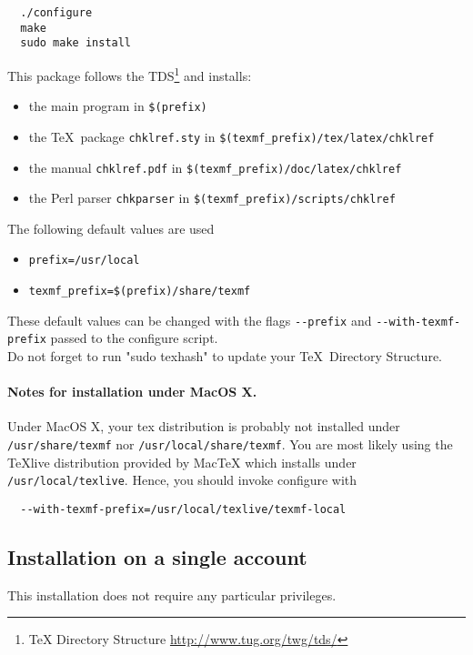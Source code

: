 \documentclass[a4paper,11pt,twoside]{article}
\begin{document}
\begin{verbatim}
  ./configure
  make
  sudo make install
\end{verbatim}
This package follows the TDS\footnote{TeX Directory Structure
  \url{http://www.tug.org/twg/tds/}} and installs:
\begin{itemize}
  \item  the main program in \verb!$(prefix)!
  \item  the \TeX\ package \verb!chklref.sty! in \verb!$(texmf_prefix)/tex/latex/chklref!
  \item  the manual \verb!chklref.pdf! in \verb!$(texmf_prefix)/doc/latex/chklref!
  \item  the Perl parser \verb!chkparser! in \verb!$(texmf_prefix)/scripts/chklref!
\end{itemize}
The following default values are used
\begin{itemize}
  \item  \verb!prefix=/usr/local!
  \item \verb!texmf_prefix=$(prefix)/share/texmf!
\end{itemize}

These default values can be changed with the flags \verb!--prefix!  and
\verb!--with-texmf-prefix! passed to the configure script.\\

Do not forget to run "sudo texhash" to update your \TeX\ Directory Structure.

\paragraph{Notes for installation under MacOS X.}

Under MacOS X, your tex distribution is probably not installed under
\verb!/usr/share/texmf! nor \verb!/usr/local/share/texmf!. You are most likely using
the TeXlive distribution provided by MacTeX which installs under
\verb!/usr/local/texlive!. Hence, you should invoke configure with

\begin{verbatim}
  --with-texmf-prefix=/usr/local/texlive/texmf-local
\end{verbatim}

\subsection{Installation on a single account}

This installation does not require any particular privileges.
\end{document}
